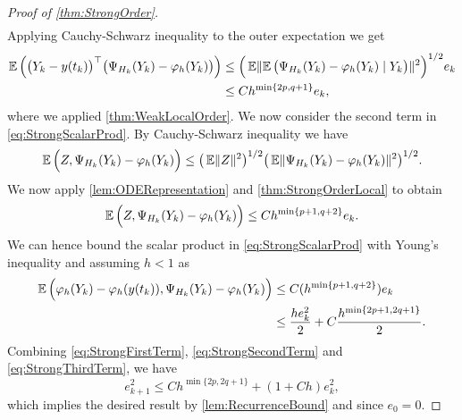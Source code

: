 \documentclass[final,onefignum,onetabnum]{siamonline171218}
\begin{document}
\begin{proof}[Proof of \cref{thm:StrongOrder}]
\begin{equation}
\begin{aligned}
	\end{aligned}
	\end{equation}
	Applying Cauchy-Schwarz inequality to the outer expectation we get
	\begin{equation}
	\begin{aligned}
		\operatorname{\mathbb{E}}\Big(\big(Y_k - y(t_k)\big)^\top \big(\Psi_{H_k}(Y_k) - \varphi_{h}(Y_k)\big)\Big) &\leq \Big(\operatorname{\mathbb{E}}\lVert\operatorname{\mathbb{E}}\big(\Psi_{H_k}(Y_k) - \varphi_{h}(Y_k) \mid Y_k\big)\rVert^{2}\Big)^{1/2}e_k  \\
		&\leq  Ch^{\min\{2p, q+1\}}e_k,
	\end{aligned}
	\end{equation}
	where we applied \cref{thm:WeakLocalOrder}. We now consider the second term in \eqref{eq:StrongScalarProd}. By Cauchy-Schwarz inequality we have
	\begin{equation}
		\operatorname{\mathbb{E}}\Big(Z, \Psi_{H_k}(Y_k) - \varphi_{h}(Y_k)\Big) \leq \big(\operatorname{\mathbb{E}}\lVert Z\rVert^{2}\big)^{1/2} \big(\operatorname{\mathbb{E}}\lVert\Psi_{H_k}(Y_k) - \varphi_{h}(Y_k)\rVert^2\big)^{1/2}.
	\end{equation}
	We now apply \cref{lem:ODERepresentation} and \cref{thm:StrongOrderLocal} to obtain
	\begin{equation}
		\operatorname{\mathbb{E}}\Big(Z, \Psi_{H_k}(Y_k) - \varphi_{h}(Y_k)\Big) \leq C h^{\min\{p+1, q+2\}} e_k.
	\end{equation}
	We can hence bound the scalar product in \eqref{eq:StrongScalarProd} with Young's inequality and assuming $h < 1$ as
	\begin{equation}\label{eq:StrongThirdTerm}
	\begin{aligned}
		\E\Big(\phi_{h}(Y_k) - \phi_{h}(y(t_k)), \Psi_{H_k}(Y_k) - \phi_{h}(Y_k)\Big) &\leq C(h^{\min\{p+1, q+2\}})e_k \\
		&\leq \frac{he_k^2}{2} + C\frac{h^{\min\{2p+1,2q+1\}}}{2}.
	\end{aligned}
	\end{equation}
	Combining \eqref{eq:StrongFirstTerm}, \eqref{eq:StrongSecondTerm} and \eqref{eq:StrongThirdTerm}, we have
	\begin{equation}
		e_{k+1}^2 \leq Ch^{\min\{2p,2q + 1\}} + (1 + Ch)e_k^2,
	\end{equation}
	which implies the desired result by \cref{lem:RecurrenceBound} and since $e_0 = 0$.
\end{proof}
\end{document}
